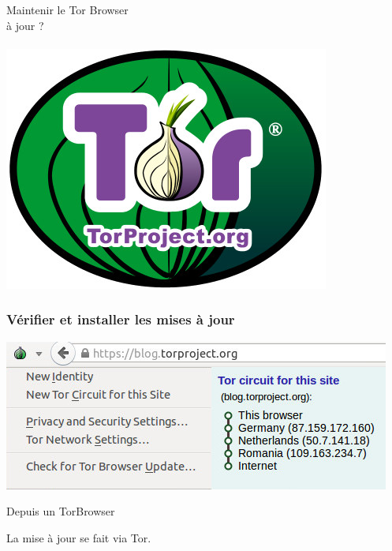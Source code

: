\documentclass{beamer}
\begin{document}
\begin{frame}
\begin{center}
\Huge{Maintenir le Tor Browser \\ à jour ? }
\\~\\ \includegraphics[scale=0.4]{./images/logo_tor.jpg}
\end{center}
\end{frame}

\begin{frame}
\frametitle{Vérifier et installer les mises à jour}
\begin{center}
\includegraphics[scale=0.6]{./images/onionmenu.jpg}
\end{center}

\begin{block}{Depuis un TorBrowser}
\begin{itemize}
\end{itemize}
La mise à jour se fait via Tor.
\end{block}
\end{frame}
\end{document}
